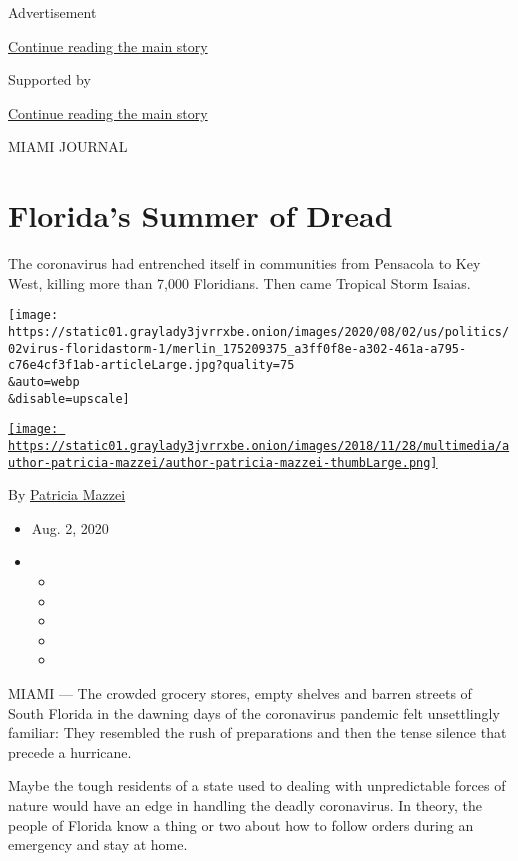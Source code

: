 Advertisement

\protect\hyperlink{after-top}{Continue reading the main story}

Supported by

\protect\hyperlink{after-sponsor}{Continue reading the main story}

MIAMI JOURNAL

\hypertarget{floridas-summer-of-dread}{%
\section{Florida's Summer of Dread}\label{floridas-summer-of-dread}}

The coronavirus had entrenched itself in communities from Pensacola to
Key West, killing more than 7,000 Floridians. Then came Tropical Storm
Isaias.

\texttt{[image: https://static01.graylady3jvrrxbe.onion/images/2020/08/02/us/politics/02virus-floridastorm-1/merlin\_175209375\_a3ff0f8e-a302-461a-a795-c76e4cf3f1ab-articleLarge.jpg?quality=75\\\&auto=webp\\\&disable=upscale]}

\href{https://www.nytimes3xbfgragh.onion/by/patricia-mazzei}{\texttt{[image: https://static01.graylady3jvrrxbe.onion/images/2018/11/28/multimedia/author-patricia-mazzei/author-patricia-mazzei-thumbLarge.png]}}

By \href{https://www.nytimes3xbfgragh.onion/by/patricia-mazzei}{Patricia
Mazzei}

\begin{itemize}
\item
  Aug. 2, 2020
\item
  \begin{itemize}
  \item
  \item
  \item
  \item
  \item
  \end{itemize}
\end{itemize}

MIAMI --- The crowded grocery stores, empty shelves and barren streets
of South Florida in the dawning days of the coronavirus pandemic felt
unsettlingly familiar: They resembled the rush of preparations and then
the tense silence that precede a hurricane.

Maybe the tough residents of a state used to dealing with unpredictable
forces of nature would have an edge in handling the deadly coronavirus.
In theory, the people of Florida know a thing or two about how to follow
orders during an emergency and stay at home.

